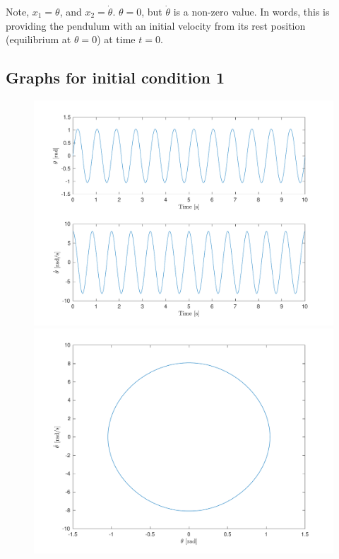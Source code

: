 \documentclass[10pt]{article}
\begin{document}
Note, $x_1 = \theta$, and $x_2 = \dot{\theta}$. 
$\theta = 0$, but $\dot{\theta}$ is a non-zero value. In words, this is providing the pendulum with an initial velocity from its rest position (equilibrium at $\theta = 0$) at time $t = 0$.

\subsection{Graphs for initial condition 1}
\begin{figure}[ht]
    \centering
    \begin{minipage}[b]{0.45\textwidth}
        \centering
        \includegraphics[width=1\linewidth]{lab1/figs/section3_x0_1_state_evolution.pdf}
    \end{minipage}
    \begin{minipage}[b]{0.45\textwidth}
        \centering
        \includegraphics[width=1\linewidth]{lab1/figs/section3_x0_1_state_orbit.pdf}
    \end{minipage}
    
    \label{figure:x_0_1_state_evolution}
\end{figure}
    
\end{document}
